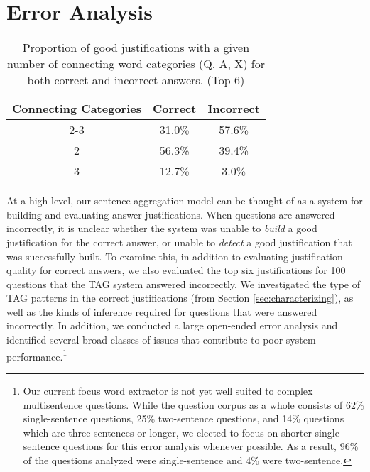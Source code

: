 \section{Error Analysis}
\label{sec:erroranalysis}

%
%
\begin{table}[t]
\caption{{ \label{font-table} Proportion of good justifications with a given number of connecting word categories (Q, A, X) for both correct and incorrect answers. (Top 6) }}
\small
\label{tab:errorconnectiontypes}
\begin{center}
\begin{tabular}{ccc}
\hline
\multicolumn{1}{l}{Connecting Categories} & \multicolumn{1}{c}{Correct} & \multicolumn{1}{c}{Incorrect}  \\
\cline{2-3}
\hline
1				&	31.0\%		& 57.6\%	\\
2				&	56.3\%		& 39.4\%	\\
3				&	12.7\%		& 3.0\%	\\
\end{tabular}



\end{center}
\end{table}

At a high-level, our sentence aggregation model can be thought of as a system for building and evaluating answer justifications.  When questions are answered incorrectly, it is unclear whether the system was unable to \emph{build} a good justification for the correct answer, or unable to \emph{detect} a good justification that was successfully built.  To examine this, in addition to evaluating justification quality for correct answers, we also evaluated the top six justifications for 100 questions that the TAG system answered incorrectly.  We investigated the type of TAG patterns in the correct justifications  (from Section \ref{sec:characterizing}), as well as the kinds of inference required for questions that were answered incorrectly.  In addition, we conducted a large open-ended error analysis and identified several broad classes of issues that contribute to poor system performance.\footnote{Our current focus word extractor is not yet well suited to complex multisentence questions. While the question corpus as a whole consists of 62\% single-sentence questions, 25\% two-sentence questions, and 14\% questions which are three sentences or longer, we elected to focus on shorter single-sentence questions for this error analysis whenever possible.  As a result, 96\% of the questions analyzed were single-sentence and 4\% were two-sentence.}

